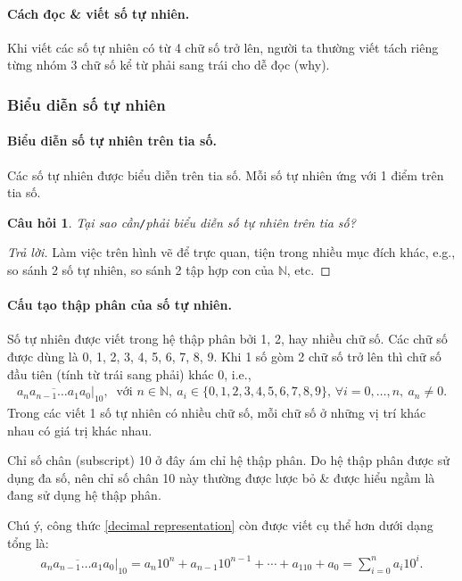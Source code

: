 \documentclass{article}
\numberwithin{equation}{section}
\newtheorem{question}{Câu hỏi}[section]
\begin{document}
\paragraph{Cách đọc \& viết số tự nhiên.} Khi viết các số tự nhiên có từ 4 chữ số trở lên, người ta thường viết tách riêng từng nhóm 3 chữ số kể từ phải sang trái cho dễ đọc (why).

\subsubsection{Biểu diễn số tự nhiên}

\paragraph{Biểu diễn số tự nhiên trên tia số.} Các số tự nhiên được biểu diễn trên tia số. Mỗi số tự nhiên ứng với 1 điểm trên tia số.

\begin{question}
	Tại sao cần\emph{\texttt{/}}phải biểu diễn số tự nhiên trên tia số?
\end{question}

\begin{proof}[Trả lời]
	Làm việc trên hình vẽ để trực quan, tiện trong nhiều mục đích khác, e.g., so sánh 2 số tự nhiên, so sánh 2 tập hợp con của $\mathbb{N}$, etc.
\end{proof}

\paragraph{Cấu tạo thập phân của số tự nhiên.} Số tự nhiên được viết trong hệ thập phân bởi 1, 2, hay nhiều chữ số. Các chữ số được dùng là 0, 1, 2, 3, 4, 5, 6, 7, 8, 9. Khi 1 số gòm 2 chữ số trở lên thì chữ số đầu tiên (tính từ trái sang phải) khác 0, i.e.,
\begin{align}
	\label{decimal representation}
	\overline{a_na_{n-1}\ldots a_1a_0}|_{10},\ \mbox{ với } n\in\mathbb{N},\ a_i\in\{0,1,2,3,4,5,6,7,8,9\},\,\forall i = 0,\ldots,n,\ a_n\ne 0.
\end{align}
Trong các viết 1 số tự nhiên có nhiều chữ số, mỗi chữ số ở những vị trí khác nhau có giá trị khác nhau.

Chỉ số chân (subscript) 10 ở đây ám chỉ hệ thập phân. Do hệ thập phân được sử dụng đa số, nên chỉ số chân 10 này thường được lược bỏ \& được hiểu ngầm là đang sử dụng hệ thập phân.

Chú ý, công thức \eqref{decimal representation} còn được viết cụ thể hơn dưới dạng tổng là:
\begin{align}
	\label{decimal representation expansion}
	\overline{a_na_{n-1}\ldots a_1a_0}|_{10} = a_n10^n + a_{n-1}10^{n-1} + \cdots + a_110 + a_0 = \sum_{i=0}^n a_i10^i.
\end{align}
\end{document}
